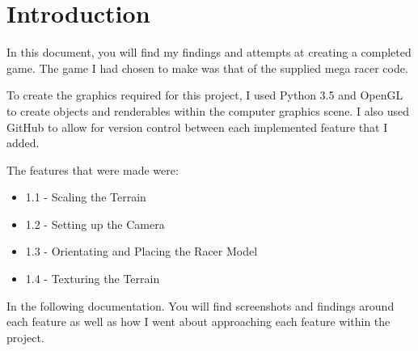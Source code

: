 \documentclass[11pt, oneside, a4paper]{article}
\begin{document}


\pagestyle{fancy}
\fancyhf{}


\newpage
\tableofcontents

\listoffigures

\newpage


\section{Introduction}
In this document, you will find my findings and attempts at creating a completed game. The game I had chosen to make was that of the supplied mega racer code.

To create the graphics required for this project, I used Python 3.5 and OpenGL to create objects and renderables within the computer graphics scene. I also used GitHub to allow for version control between each implemented feature that I added.

The features that were made were:
\begin{itemize}
	\item{1.1 - Scaling the Terrain}
	\item{1.2 - Setting up the Camera}
	\item{1.3 - Orientating and Placing the Racer Model}
	\item{1.4 - Texturing the Terrain}
\end{itemize}

In the following documentation. You will find screenshots and findings around each feature as well as how I went about approaching each feature within the project.
\end{document}
